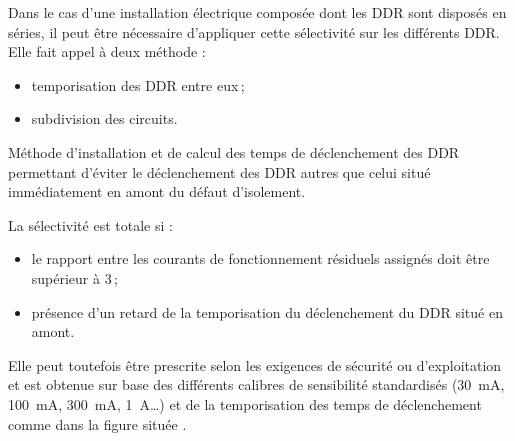 Dans le cas d'une installation électrique composée dont les DDR sont disposés en séries, il peut être nécessaire d'appliquer cette sélectivité sur les différents DDR. Elle fait appel à deux méthode : 
\begin{itemize}
\item temporisation des DDR entre eux\,;
\item subdivision des circuits.
\end{itemize}

\begin{definition}
Méthode d'installation et de calcul des temps de déclenchement des DDR permettant d'éviter le déclenchement des DDR autres que celui situé immédiatement en amont du défaut d'isolement.
\end{definition}

La sélectivité est totale si :
\begin{itemize}
\item le rapport entre les courants de fonctionnement résiduels assignés doit être supérieur à 3\,;
\item présence d'un retard de la temporisation du déclenchement du DDR situé en amont.
\end{itemize}
Elle peut toutefois être prescrite selon les exigences de sécurité ou d'exploitation et est obtenue sur base des différents calibres de sensibilité standardisés (\SI{30}{\milli\ampere}, \SI{100}{\milli\ampere}, \SI{300}{\milli\ampere}, \SI{1}{\ampere}\ldots) et de la temporisation des temps de déclenchement comme dans la figure située .

